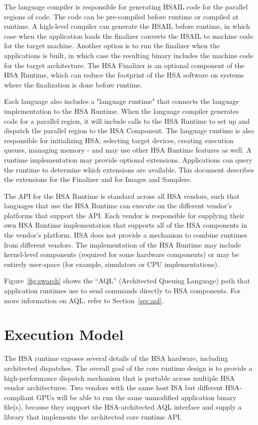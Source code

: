 \documentclass[final]{book}
\begin{document}
The language compiler is responsible for generating HSAIL code for the parallel
regions of code. The code can be pre-compiled before runtime or compiled at 
runtime. A high-level compiler can generate the HSAIL before runtime, in which 
case when the application loads the finalizer converts the HSAIL to machine 
code for the target machine. Another option is to run the finalizer when 
the applications is built, in which case the resulting binary includes the machine 
code for the target architecture. The HSA Finalizer is an optional component of 
the HSA Runtime, which can reduce the footprint of the HSA software on systems 
where the finalization is done before runtime.

Each language also includes a "language runtime" that connects the language
implementation to the HSA Runtime. When the language compiler generates code for
a parallel region, it will include calls to the HSA Runtime to set up and
dispatch the parallel region to the HSA Component. The language runtime is also
responsible for initializing HSA, selecting target devices, creating execution
queues, managing memory - and may use other HSA Runtime features as well.
A runtime implementation may provide optional extensions. Applications can
query the runtime to determine which extensions are available. This document 
describes the extensions for the Finalizer and for Images and Samplers.

The API for the HSA Runtime is standard across all HSA vendors, such that
languages that use the HSA Runtime can execute on the different vendor's
platforms that support the API. Each vendor is responsible for supplying their 
own HSA Runtime implementation that supports all of the HSA components in the 
vendor's platform. HSA does not provide a mechanism to combine runtimes from 
different vendors. The implementation of the HSA Runtime may include 
kernel-level components (required for some hardware components) or may be entirely 
user-space (for example, simulators or CPU implementations).

Figure~\ref{fig:swarch} shows the ``AQL'' (Architected Queuing
Language) path that application runtimes use to send commands directly to
HSA components. For more information on AQL, refer to Section~\ref{sec:aql}.


\section{Execution Model}\label{executionmodel}

The HSA runtime exposes several details of the HSA hardware, including
architected dispatches. The overall goal of the core runtime design is to
provide a high-performance dispatch mechanism that is portable across multiple
HSA vendor architectures. Two vendors with the same host ISA but different
HSA-compliant GPUs will be able to run the same unmodified application binary 
file(s), because they support the HSA-architected AQL interface and supply a 
library that implements the architected core runtime API.
\end{document}
